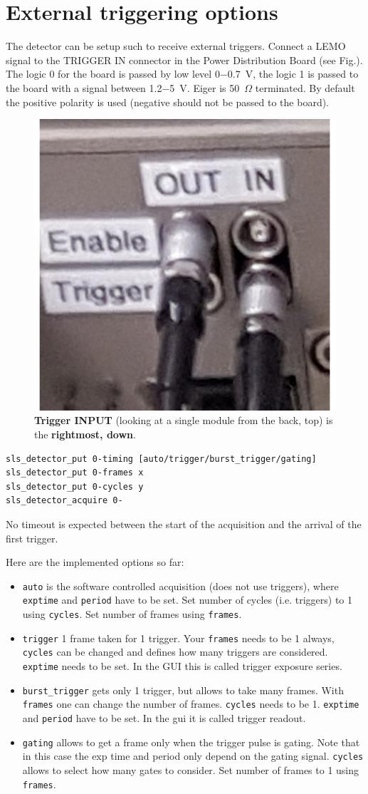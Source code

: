 \documentclass{article}
\begin{document}
\section{External triggering options}\label{triggering}
The detector can be setup such to receive external triggers. Connect a LEMO signal to the TRIGGER IN connector in the Power Distribution Board (see Fig.). The logic 0 for the board is passed by low level 0$-$0.7~V, the logic 1 is passed to the board with a signal between 1.2$-$5~V. Eiger is 50~$\Omega$ terminated. By default the positive polarity is used (negative should not be passed to the board).

\begin{figure}[t]
\begin{center}
\includegraphics[width=.4\textwidth]{tiggerIN}
\end{center}
\caption{\textbf{Trigger INPUT} (looking at a single module from the back, top) is the \textbf{rightmost, down}.}
\label{triggerIN}
\end{figure}

\begin{verbatim}
sls_detector_put 0-timing [auto/trigger/burst_trigger/gating]
sls_detector_put 0-frames x
sls_detector_put 0-cycles y
sls_detector_acquire 0-
\end{verbatim}
No timeout is expected between the start of the acquisition and the arrival of the first trigger. 

Here are the implemented options so far:
\begin{itemize}
\item {\tt{auto}} is the software controlled acquisition (does not use triggers), where {\tt{exptime}} and {\tt{period}} have to be set. Set number of cycles (i.e. triggers) to 1 using {\tt{cycles}}. Set number of frames using {\tt{frames}}.
\item {\tt{trigger}} 1 frame taken for 1 trigger. Your {\tt{frames}} needs to be  1 always, {\tt{cycles}} can be changed and defines how many triggers are considered.  {\tt{exptime}} needs to be set. In the GUI this is called trigger exposure series.  
\item {\tt{burst\_trigger}} gets only 1 trigger, but allows to take many frames. With {\tt{frames}} one can change the number of frames. {\tt{cycles}} needs to be 1.  {\tt{exptime}} and {\tt{period}} have to be set. In the gui it is called trigger readout.
\item{\tt{gating}} allows to get a frame only when the trigger pulse is gating. Note that in this case the exp time and period only depend on the gating signal. {\tt{cycles}} allows to select how many gates to consider.  Set number of frames to 1 using {\tt{frames}}.
\end{itemize}
\end{document}
